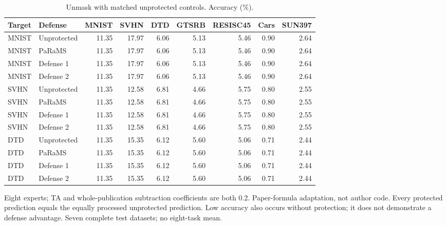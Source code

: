 \begin{table}[t]
\centering\small
\setlength{\tabcolsep}{4pt}
\caption{Unmask with matched unprotected controls. Accuracy (\%).}
\label{tab:unmask}
\begin{tabular}{@{}llrrrrrrr@{}}
\toprule
Target & Defense & MNIST & SVHN & DTD & GTSRB & RESISC45 & Cars & SUN397 \\
\midrule
MNIST & Unprotected & 11.35 & 17.97 & 6.06 & 5.13 & 5.46 & 0.90 & 2.64 \\
MNIST & PaRaMS & 11.35 & 17.97 & 6.06 & 5.13 & 5.46 & 0.90 & 2.64 \\
MNIST & Defense 1 & 11.35 & 17.97 & 6.06 & 5.13 & 5.46 & 0.90 & 2.64 \\
MNIST & Defense 2 & 11.35 & 17.97 & 6.06 & 5.13 & 5.46 & 0.90 & 2.64 \\
\midrule
SVHN & Unprotected & 11.35 & 12.58 & 6.81 & 4.66 & 5.75 & 0.80 & 2.55 \\
SVHN & PaRaMS & 11.35 & 12.58 & 6.81 & 4.66 & 5.75 & 0.80 & 2.55 \\
SVHN & Defense 1 & 11.35 & 12.58 & 6.81 & 4.66 & 5.75 & 0.80 & 2.55 \\
SVHN & Defense 2 & 11.35 & 12.58 & 6.81 & 4.66 & 5.75 & 0.80 & 2.55 \\
\midrule
DTD & Unprotected & 11.35 & 15.35 & 6.12 & 5.60 & 5.06 & 0.71 & 2.44 \\
DTD & PaRaMS & 11.35 & 15.35 & 6.12 & 5.60 & 5.06 & 0.71 & 2.44 \\
DTD & Defense 1 & 11.35 & 15.35 & 6.12 & 5.60 & 5.06 & 0.71 & 2.44 \\
DTD & Defense 2 & 11.35 & 15.35 & 6.12 & 5.60 & 5.06 & 0.71 & 2.44 \\
\bottomrule
\end{tabular}
\par\smallskip
\begin{minipage}{\textwidth}\footnotesize Eight experts; TA and whole-publication subtraction coefficients are both 0.2. Paper-formula adaptation, not author code. Every protected prediction equals the equally processed unprotected prediction. Low accuracy also occurs without protection; it does not demonstrate a defense advantage. Seven complete test datasets; no eight-task mean.\end{minipage}
\end{table}
